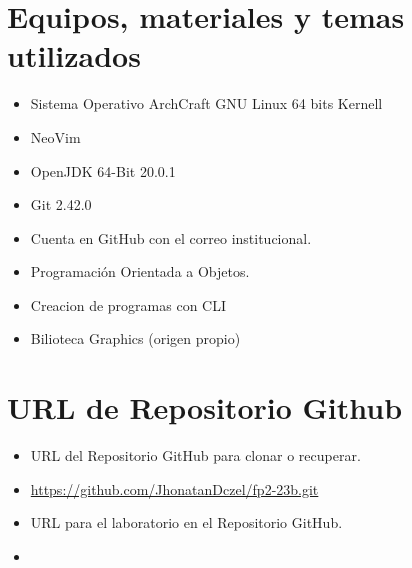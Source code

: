 	\section{Equipos, materiales y temas utilizados}
	\begin{itemize}
		\item Sistema Operativo ArchCraft GNU Linux 64 bits Kernell
		\item NeoVim
		\item OpenJDK 64-Bit 20.0.1 
		\item Git 2.42.0
		\item Cuenta en GitHub con el correo institucional.
		\item Programación Orientada a Objetos.
		\item Creacion de programas con CLI	
            \item Bilioteca Graphics (origen propio)
	\end{itemize}
	\section{URL de Repositorio Github}
	\begin{itemize}
            \item URL del Repositorio GitHub para clonar o recuperar.
            \item \url{https://github.com/JhonatanDczel/fp2-23b.git}
            \item URL para el laboratorio \itemPracticeNumber{} en el Repositorio GitHub.
            \item \itemUrl
	\end{itemize}
